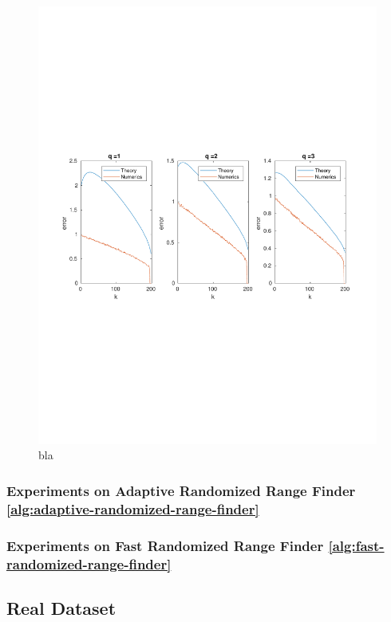 \begin{figure}[ht]
\begin{center}
\includegraphics[width=\textwidth]{figures/1-5.pdf}
\end{center}
\caption{bla}
\end{figure}

\subsubsection{Experiments on Adaptive Randomized Range Finder
\ref{alg:adaptive-randomized-range-finder}}

\subsubsection{Experiments on Fast Randomized Range Finder
\ref{alg:fast-randomized-range-finder}}
\label{sec:gaussian-matrices}
\subsection{Real Dataset}
